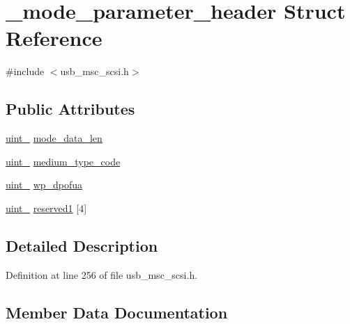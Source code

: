 \hypertarget{struct__mode__parameter__header}{}\section{\+\_\+mode\+\_\+parameter\+\_\+header Struct Reference}
\label{struct__mode__parameter__header}


{\ttfamily \#include $<$usb\+\_\+msc\+\_\+scsi.\+h$>$}

\subsection*{Public Attributes}
\begin{DoxyCompactItemize}
\item 
\hyperlink{types_8h_a8ab774e38493b7c7e4d8edfd5004e66b}{uint\+\_} \hyperlink{struct__mode__parameter__header_afaa5757800de8759d8eadfb3ddbd95cf}{mode\+\_\+data\+\_\+len}
\item 
\hyperlink{types_8h_ad3209046c23f739a81581c10a4be7d92}{uint\+\_} \hyperlink{struct__mode__parameter__header_a03d4adbac0172fc400d2f406d100ddbe}{medium\+\_\+type\+\_\+code}
\item 
\hyperlink{types_8h_ad3209046c23f739a81581c10a4be7d92}{uint\+\_} \hyperlink{struct__mode__parameter__header_a2396a990a4a179272e4f8d2aec4a9221}{wp\+\_\+dpofua}
\item 
\hyperlink{types_8h_ad3209046c23f739a81581c10a4be7d92}{uint\+\_} \hyperlink{struct__mode__parameter__header_a02b311a65b94cc5299907119a9f6584e}{reserved1} \mbox{[}4\mbox{]}
\end{DoxyCompactItemize}


\subsection{Detailed Description}


Definition at line 256 of file usb\+\_\+msc\+\_\+scsi.\+h.



\subsection{Member Data Documentation}
